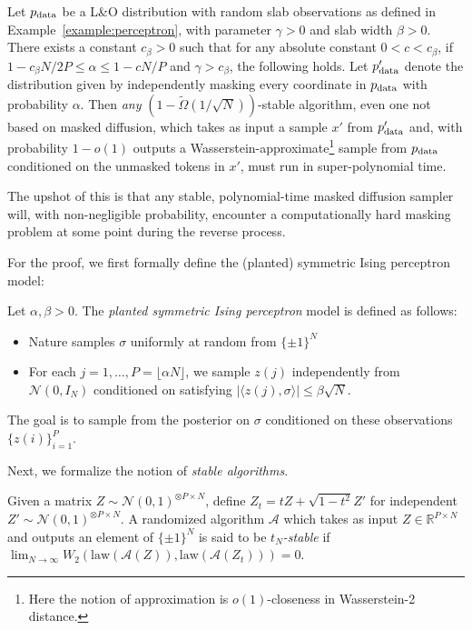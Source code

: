 \begin{proposition}\label{prop:perceptron_masking}
    Let $p_{\rm data}$ be a L\&O distribution with random slab observations as defined in Example~\ref{example:perceptron}, with parameter $\gamma > 0$ and slab width $\beta > 0$. There exists a constant $c_\beta > 0$ such that for any absolute constant $0 < c < c_\beta$, 
    if $1 - c_\beta N/2P \le \alpha \le 1 - c N / P$ and $\gamma > c_\beta$, the following holds. Let $p'_{\rm data}$ denote the distribution given by independently masking every coordinate in $p_{\rm data}$ with probability $\alpha$. Then \emph{any} $(1 - \tilde{\Omega}(1/\sqrt{N}))$-stable algorithm, even one not based on masked diffusion, which takes as input a sample $x'$ from $p'_{\rm data}$ and, with probability $1 - o(1)$ outputs a Wasserstein-approximate\footnote{Here the notion of approximation is $o(1)$-closeness in Wasserstein-2 distance.} sample from $p_{\rm data}$ conditioned on the unmasked tokens in $x'$, must run in super-polynomial time.
\end{proposition}

The upshot of this is that any stable, polynomial-time masked diffusion sampler will, with non-negligible probability, encounter a computationally hard masking problem at some point during the reverse process.

For the proof, we first formally define the (planted) symmetric Ising perceptron model:

\begin{definition}
    Let $\alpha, \beta > 0$. The \emph{planted symmetric Ising perceptron} model is defined as follows: 
    \begin{itemize}
        \item Nature samples $\sigma$ uniformly at random from $\{\pm 1\}^N$
        \item For each $j = 1,\ldots,P = \lfloor \alpha N\rfloor$, we sample  $z{(j)}$ independently from $\mathcal{N}(0,I_N)$ conditioned on satisfying $|\langle z{(j)}, \sigma\rangle| \le \beta\sqrt{N}$.
    \end{itemize}
    The goal is to sample from the posterior on $\sigma$ conditioned on these observations $\{z{(i)}\}^P_{i=1}$.
\end{definition}

Next, we formalize the notion of \emph{stable algorithms}.

\begin{definition}\label{def:stable}
    Given a matrix $Z\sim\mathcal{N}(0,1)^{\otimes P\times N}$, define $Z_t = tZ + \sqrt{1 - t^2}Z'$ for independent $Z'\sim\mathcal{N}(0,1)^{\otimes P\times N}$. 
    A randomized algorithm $\mathcal{A}$ which takes as input $Z\in\mathbb{R}^{P\times N}$ and outputs an element of $\{\pm 1\}^N$ is said to be \emph{$t_N$-stable} if $\lim_{N\to\infty} W_2(\mathrm{law}(\mathcal{A}(Z)), \mathrm{law}(\mathcal{A}(Z_t))) = 0$.
\end{definition}

